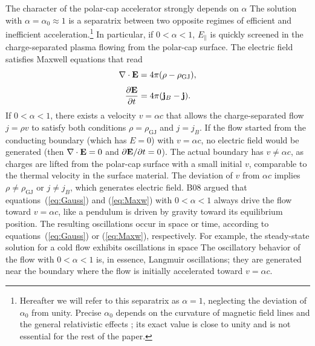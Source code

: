 The character of the polar-cap accelerator strongly depends on $\alpha$
\citep[hereafter B08]{mestel_axisymmetric_1985, beloborodov_polar-cap_2008}
The solution with $\alpha=\alpha_0\approx 1$ is a separatrix between two
opposite regimes of efficient and inefficient acceleration.\footnote{
      Hereafter we will refer to this separatrix as $\alpha=1$, neglecting the
      deviation of $\alpha_0$ from unity. Precise $\alpha_0$ depends on
      the curvature of magnetic field lines and the general
      relativistic effects
      \citep{muslimov_general_1992};
      its exact value is close to unity and
      is not essential for the rest of the paper.}
In particular,  if $0<\alpha<1$, $E_\parallel$ is quickly screened in the
charge-separated plasma flowing from the polar-cap surface. The electric field
satisfies
Maxwell equations that read
\citep[in the co-rotating frame of the star, see e.g.][]{fawley_potential_1977,levinson_large-amplitude_2005}
\begin{equation}
\label{eq:Gauss}
   \nabla\cdot{\mathbf E}=4\pi(\rho-\rho_\mathrm{GJ}),
 \end{equation}
 \begin{equation}
 \label{eq:Maxw}
   \frac{\partial{\mathbf E}}{\partial t}=4\pi(\mathbf{j}_B-\mathbf{j}).
\end{equation}
If $0<\alpha<1$, there exists a velocity $v=\alpha c$ that allows the charge-separated
flow $j=\rho v$ to satisfy both conditions $\rho=\rho_\mathrm{GJ}$ and $j=j_B$.
If the flow started from the conducting boundary (which has $E=0$) with
$v=\alpha c$, no electric field would be generated (then $\nabla\cdot{\mathbf E}=0$
and $\partial{\mathbf E}/\partial t=0$). The actual boundary has $v\neq \alpha c$, as
charges are lifted from the polar-cap surface with a small initial $v$,
comparable to the thermal velocity in the surface material.
The deviation of $v$ from $\alpha c$ implies $\rho\neq\rho_\mathrm{GJ}$ or
$j\neq j_B$, which generates electric field.
B08 argued that
equations~(\ref{eq:Gauss}) and (\ref{eq:Maxw}) with $0<\alpha<1$
always drive the flow toward $v=\alpha c$,
like a pendulum is driven by gravity toward its equilibrium position.
The resulting oscillations occur in space or time,
according to equations~(\ref{eq:Gauss}) or (\ref{eq:Maxw}), respectively.
For example, the steady-state solution for a cold flow exhibits
oscillations in space
\citep[B08]{mestel_axisymmetric_1985}
The oscillatory behavior of the flow with $0<\alpha<1$ is, in essence, Langmuir
oscillations; they are generated near the boundary where the flow is initially
accelerated toward $v=\alpha c$.

